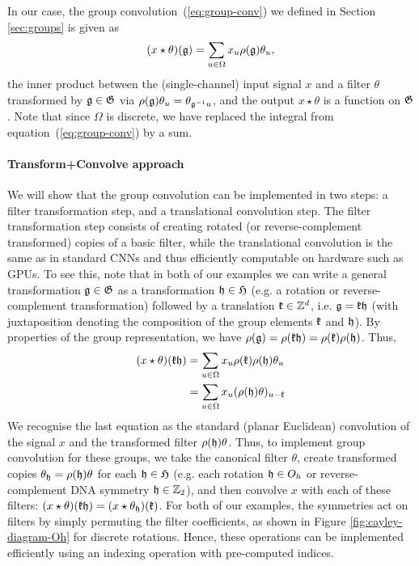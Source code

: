 In our case, 
the group convolution~(\ref{eq:group-conv}) we defined in Section \ref{sec:groups} is given as 
\begin{equation}
    (x \star \theta)({\mathfrak{g}}) = \sum_{u \in \Omega} x_u \rho({\mathfrak{g}}) \theta_u,
\end{equation}
the inner product between the (single-channel) input signal $x$ and a filter $\theta$ transformed by ${\mathfrak{g}} \in {\mathfrak{G}}$ via $\rho({\mathfrak{g}}) \theta_u = \theta_{{\mathfrak{g}}^{-1} u}$, and the output $x\star \theta$ is a function on ${\mathfrak{G}}$. 
Note that since $\Omega$ is discrete, we have replaced the integral from equation~(\ref{eq:group-conv}) by a sum. %


\paragraph{Transform+Convolve approach}
We will show that the group convolution can be implemented in two steps: a filter transformation step, and a translational convolution step.
The filter transformation step consists of creating rotated (or reverse-complement transformed) copies of a basic filter, while the translational convolution is the same as in standard CNNs and thus efficiently computable on hardware such as GPUs.  %
To see this, note that in both of our examples we can write a general transformation ${\mathfrak{g}} \in {\mathfrak{G}}$ as a transformation ${\mathfrak{h}} \in {\mathfrak{H}}$ (e.g. a rotation or reverse-complement transformation) followed by a translation ${\mathfrak{k}} \in \mathbb{Z}^d$, i.e. ${\mathfrak{g}} = {\mathfrak{k}} {\mathfrak{h}}$ (with juxtaposition denoting the composition of the group elements ${\mathfrak{k}}$ and ${\mathfrak{h}}$).
By properties of the group representation, %
we have $\rho({\mathfrak{g}}) = \rho({\mathfrak{k}} {\mathfrak{h}}) = \rho({\mathfrak{k}}) \rho({\mathfrak{h}})$.
Thus, %
\begin{equation}
    \begin{aligned}
        (x\star \theta )({\mathfrak{k}} {\mathfrak{h}}) 
        &=
        \sum_{u \in \Omega} x_u \rho({\mathfrak{k}}) \rho({\mathfrak{h}}) \theta_{u} \\
        &=
        \sum_{u \in \Omega} x_u (\rho({\mathfrak{h}}) \theta)_{u - {\mathfrak{k}}}
    \end{aligned}
\end{equation}
We recognise the last equation as the standard (planar Euclidean) convolution of the signal $x$ and the transformed filter $\rho({\mathfrak{h}}) \theta$.
Thus, to implement group convolution for these groups, we take the canonical filter $\theta$, create transformed copies $\theta_{\mathfrak{h}} = \rho({\mathfrak{h}}) \theta$ for each ${\mathfrak{h}} \in {\mathfrak{H}}$ (e.g. each rotation ${\mathfrak{h}} \in O_h$ or reverse-complement DNA symmetry ${\mathfrak{h}} \in \mathbb{Z}_2$), and then convolve $x$ with each of these filters: $(x\star \theta )({\mathfrak{k}} {\mathfrak{h}})  = (x\star \theta_{{\mathfrak{h}}} )({\mathfrak{k}})$.
For both of our examples, the symmetries act on filters by simply permuting the filter coefficients, as shown in Figure \ref{fig:cayley-diagram-Oh} for discrete rotations.
Hence, these operations can be implemented efficiently using an indexing operation with pre-computed indices.


